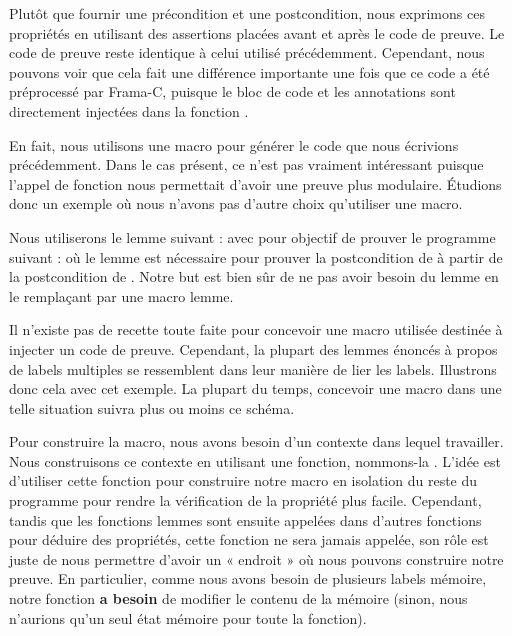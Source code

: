 

Plutôt que fournir une précondition et une postcondition, nous exprimons ces
propriétés en utilisant des assertions placées avant et après le code de preuve.
Le code de preuve reste identique à celui utilisé précédemment. Cependant,
nous pouvons voir que cela
fait une différence importante une fois que ce code a été préprocessé par
Frama-C, puisque le bloc de code et les annotations sont directement injectées
dans la fonction .




En fait, nous utilisons une macro pour générer le code que nous écrivions
précédemment. Dans le cas présent, ce n'est pas vraiment intéressant puisque
l'appel de fonction nous permettait d'avoir une preuve plus modulaire. Étudions
donc un exemple où nous n'avons pas d'autre choix qu'utiliser une macro.


Nous utiliserons le lemme suivant :
avec pour objectif de prouver le programme suivant :
où le lemme  est nécessaire pour prouver la
postcondition de  à partir de la postcondition de
. Notre but est bien sûr de ne pas avoir besoin du
lemme en le remplaçant par une macro lemme.


Il n'existe pas de recette toute faite pour concevoir une macro utilisée
destinée à injecter un code de preuve. Cependant, la plupart des lemmes énoncés
à propos de labels multiples se ressemblent dans leur manière de lier les labels.
Illustrons donc cela avec cet exemple. La plupart du temps, concevoir une macro
dans une telle situation suivra plus ou moins ce schéma.


Pour construire la macro, nous avons besoin d'un contexte dans lequel travailler.
Nous construisons ce contexte en utilisant une fonction,
nommons-la . L'idée est d'utiliser
cette fonction pour construire notre macro en isolation du reste du programme pour
rendre la vérification de la propriété plus facile. Cependant, tandis que les
fonctions lemmes sont ensuite appelées dans d'autres fonctions pour déduire
des propriétés, cette fonction ne sera jamais appelée, son rôle est juste de nous
permettre d'avoir un « endroit » où nous pouvons construire notre preuve. En
particulier, comme nous avons besoin de plusieurs labels mémoire, notre fonction
\textbf{a besoin} de modifier le contenu de la mémoire (sinon, nous n'aurions
qu'un seul état mémoire pour toute la fonction).


